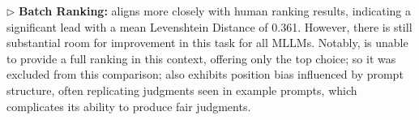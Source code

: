     $\triangleright$ \textbf{Batch Ranking:}  aligns more closely with human ranking results, indicating a significant lead with a mean Levenshtein Distance of 0.361. However, there is still substantial room for improvement in this task for all MLLMs. Notably,  is unable to provide a full ranking in this context, offering only the top choice; so it was excluded from this comparison;  also exhibits position bias influenced by prompt structure, often replicating judgments seen in example prompts, which complicates its ability to produce fair judgments.

\begin{table}[t]
\centering
\large
\caption{Consistency comparisons of  and  in 10 datasets. Average means weighted average for consistency times, ``MCC'' stands for ``Majority Consistency Criterion'', which deems responses consistent if over half of them are identical across our 6 repetitions of experiments.}
\renewcommand\arraystretch{1.2}
  \vspace{-15pt}
\label{tab: consistency}

\end{table}


